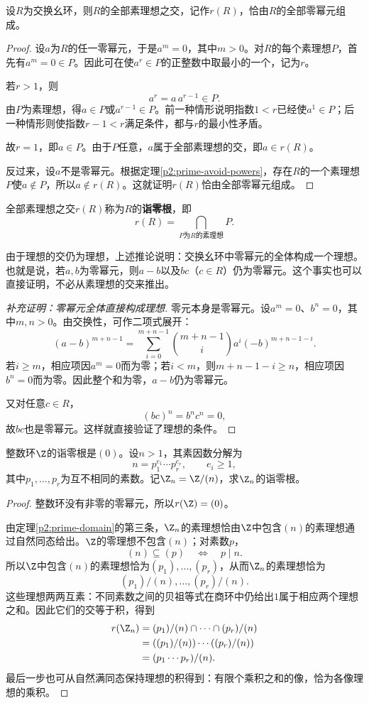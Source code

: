 \begin{corollary}
设$R$为交换幺环，则$R$的全部素理想之交，记作$r(R)$，恰由$R$的全部零幂元组成。
\end{corollary}
\begin{proof}
设$a$为$R$的任一零幂元，于是$a^m=0$，其中$m>0$。对$R$的每个素理想$P$，首先有$a^m=0\in P$。因此可在使$a^r\in P$的正整数中取最小的一个，记为$r$。

若$r>1$，则
\[
a^r=a\,a^{r-1}\in P.
\]
由$P$为素理想，得$a\in P$或$a^{r-1}\in P$。前一种情形说明指数$1<r$已经使$a^1\in P$；后一种情形则使指数$r-1<r$满足条件，都与$r$的最小性矛盾。

故$r=1$，即$a\in P$。由于$P$任意，$a$属于全部素理想的交，即$a\in r(R)$。

反过来，设$a$不是零幂元。根据定理\ref{p2:prime-avoid-powers}，存在$R$的一个素理想$P$使$a\notin P$，所以$a\notin r(R)$。这就证明$r(R)$恰由全部零幂元组成。
\end{proof}

\begin{definition}
全部素理想之交$r(R)$称为$R$的\textbf{诣零根}，即
\[
r(R)=\bigcap_{P\text{为}R\text{的素理想}}P.
\]
\end{definition}

由于理想的交仍为理想，上述推论说明：交换幺环中零幂元的全体构成一个理想。也就是说，若$a,b$为零幂元，则$a-b$以及$bc$（$c\in R$）仍为零幂元。这个事实也可以直接证明，不必从素理想的交来推出。

\begin{proof}[补充证明：零幂元全体直接构成理想]
零元本身是零幂元。设$a^m=0$、$b^n=0$，其中$m,n>0$。由交换性，可作二项式展开：
\[
(a-b)^{m+n-1}
=\sum_{i=0}^{m+n-1}\binom{m+n-1}{i}a^i(-b)^{m+n-1-i}.
\]
若$i\ge m$，相应项因$a^m=0$而为零；若$i<m$，则$m+n-1-i\ge n$，相应项因$b^n=0$而为零。因此整个和为零，$a-b$仍为零幂元。

又对任意$c\in R$，
\[
(bc)^n=b^nc^n=0,
\]
故$bc$也是零幂元。这样就直接验证了理想的条件。
\end{proof}

\begin{example}
整数环$\Z$的诣零根是$(0)$。设$n>1$，其素因数分解为
\[
n=p_1^{e_1}\cdots p_r^{e_r},\qquad e_i\ge1,
\]
其中$p_1,\ldots,p_r$为互不相同的素数。记$\Z_n=\Z/(n)$，求$\Z_n$的诣零根。
\end{example}
\begin{proof}
整数环没有非零的零幂元，所以$r(\Z)=(0)$。

由定理\ref{p2:prime-domain}的第三条，$\Z_n$的素理想恰由$\Z$中包含$(n)$的素理想通过自然同态给出。$\Z$的零理想不包含$(n)$；对素数$p$，
\[
(n)\subseteq(p)\quad\Longleftrightarrow\quad p\mid n.
\]
所以$\Z$中包含$(n)$的素理想恰为$(p_1),\ldots,(p_r)$，从而$\Z_n$的素理想恰为
\[
(p_1)/(n),\ldots,(p_r)/(n).
\]
这些理想两两互素：不同素数之间的贝祖等式在商环中仍给出$1$属于相应两个理想之和。因此它们的交等于积，得到
\begin{align*}
r(\Z_n)
&=(p_1)/(n)\cap\cdots\cap(p_r)/(n)\\
&=((p_1)/(n))\cdots((p_r)/(n))\\
&=(p_1\cdots p_r)/(n).
\end{align*}
最后一步也可从自然满同态保持理想的积得到：有限个乘积之和的像，恰为各像理想的乘积。
\end{proof}

